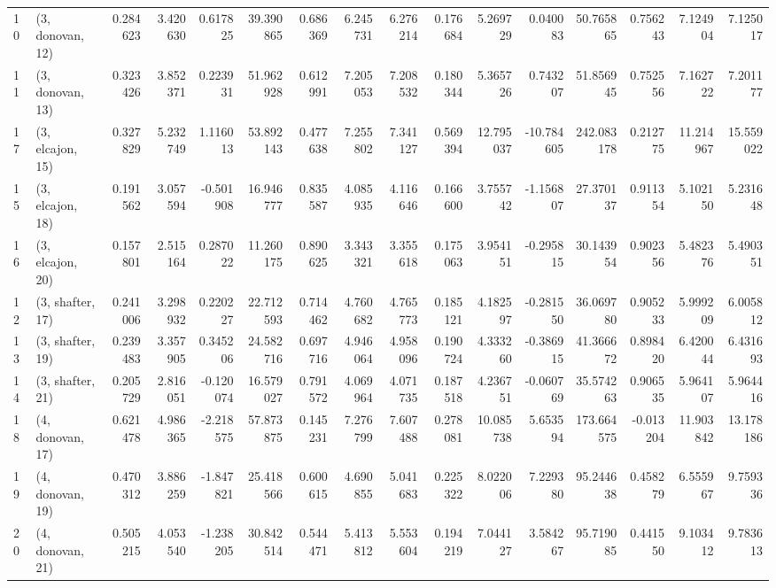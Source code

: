 \begin{tabular}{llrrrrrrrrrrrrrr}
10 &  (3, donovan, 12) &   0.284623 &  3.420630 &  0.617825 &  39.390865 &  0.686369 &   6.245731 &  6.276214 &  0.176684 &   5.269729 &   0.040083 &   50.765865 &  0.756243 &   7.124904 &   7.125017 \\
11 &  (3, donovan, 13) &   0.323426 &  3.852371 &  0.223931 &  51.962928 &  0.612991 &   7.205053 &  7.208532 &  0.180344 &   5.365726 &   0.743207 &   51.856945 &  0.752556 &   7.162722 &   7.201177 \\
17 &  (3, elcajon, 15) &   0.327829 &  5.232749 &  1.116013 &  53.892143 &  0.477638 &   7.255802 &  7.341127 &  0.569394 &  12.795037 & -10.784605 &  242.083178 &  0.212775 &  11.214967 &  15.559022 \\
15 &  (3, elcajon, 18) &   0.191562 &  3.057594 & -0.501908 &  16.946777 &  0.835587 &   4.085935 &  4.116646 &  0.166600 &   3.755742 &  -1.156807 &   27.370137 &  0.911354 &   5.102150 &   5.231648 \\
16 &  (3, elcajon, 20) &   0.157801 &  2.515164 &  0.287022 &  11.260175 &  0.890625 &   3.343321 &  3.355618 &  0.175063 &   3.954151 &  -0.295815 &   30.143954 &  0.902356 &   5.482376 &   5.490351 \\
12 &  (3, shafter, 17) &   0.241006 &  3.298932 &  0.220227 &  22.712593 &  0.714462 &   4.760682 &  4.765773 &  0.185121 &   4.182597 &  -0.281550 &   36.069780 &  0.905233 &   5.999209 &   6.005812 \\
13 &  (3, shafter, 19) &   0.239483 &  3.357905 &  0.345206 &  24.582716 &  0.697716 &   4.946064 &  4.958096 &  0.190724 &   4.333260 &  -0.386915 &   41.366672 &  0.898420 &   6.420044 &   6.431693 \\
14 &  (3, shafter, 21) &   0.205729 &  2.816051 & -0.120074 &  16.579027 &  0.791572 &   4.069964 &  4.071735 &  0.187518 &   4.236751 &  -0.060769 &   35.574263 &  0.906535 &   5.964107 &   5.964416 \\
18 &  (4, donovan, 17) &   0.621478 &  4.986365 & -2.218575 &  57.873875 &  0.145231 &   7.276799 &  7.607488 &  0.278081 &  10.085738 &   5.653594 &  173.664575 & -0.013204 &  11.903842 &  13.178186 \\
19 &  (4, donovan, 19) &   0.470312 &  3.886259 & -1.847821 &  25.418566 &  0.600615 &   4.690855 &  5.041683 &  0.225322 &   8.022006 &   7.229380 &   95.244638 &  0.458279 &   6.555967 &   9.759336 \\
20 &  (4, donovan, 21) &   0.505215 &  4.053540 & -1.238205 &  30.842514 &  0.544471 &   5.413812 &  5.553604 &  0.194219 &   7.044127 &   3.584267 &   95.719085 &  0.441550 &   9.103412 &   9.783613 \\

\end{tabular}
